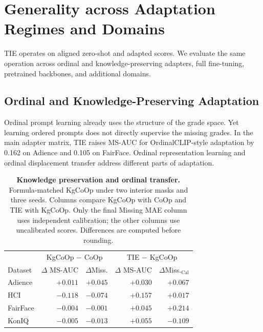 \section{Generality across Adaptation Regimes and Domains}
\label{sec:supp_generality}

TIE operates on aligned zero-shot and adapted scores.
We evaluate the same operation across ordinal and knowledge-preserving adapters, full fine-tuning, pretrained backbones, and additional domains.

\subsection{Ordinal and Knowledge-Preserving Adaptation}
\label{sec:supp_ordinal_adaptation}

Ordinal prompt learning already uses the structure of the grade space. Yet learning ordered prompts does not directly supervise the missing grades. In the main adapter matrix, TIE raises MS-AUC for OrdinalCLIP-style adaptation by 0.162 on Adience and 0.105 on FairFace. Ordinal representation learning and ordinal displacement transfer address different parts of adaptation.

\begin{table}[!t]
\centering
\caption{\textbf{Knowledge preservation and ordinal transfer.}
Formula-matched KgCoOp under two interior masks and three seeds.
Columns compare KgCoOp with CoOp and TIE with KgCoOp.
Only the final Missing MAE column uses independent calibration; the other columns use uncalibrated scores.
Differences are computed before rounding.}
\label{tab:supp_kgcoop}
\footnotesize
\setlength{\tabcolsep}{2pt}
\begin{tabular*}{\columnwidth}{@{\extracolsep{\fill}}lrrrr@{}}
\toprule
& \multicolumn{2}{c}{KgCoOp $-$ CoOp}
& \multicolumn{2}{c}{TIE $-$ KgCoOp} \\
\cmidrule(lr){2-3}
\cmidrule(l){4-5}
Dataset
& \shortstack{$\Delta$\\MS-AUC}
& $\Delta$Miss.
& \shortstack{$\Delta$\\MS-AUC}
& $\Delta$Miss.$_{\mathrm{Cal}}$ \\
\midrule
Adience
& $+0.011$ & $+0.045$ & $+0.030$ & $+0.067$ \\
HCI
& $\mathbf{-0.118}$ & $\mathbf{-0.074}$
& $+0.157$ & $+0.017$ \\
FairFace
& $-0.004$ & $-0.001$
& $+0.045$ & $+0.214$ \\
KonIQ
& $-0.005$ & $-0.013$
& $+0.055$ & $-0.109$ \\
\bottomrule
\end{tabular*}
\end{table}


